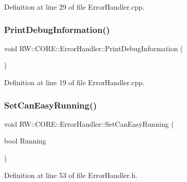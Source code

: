 Definition at line 29 of file Error\+Handler.\+cpp.

\hypertarget{class_r_w_1_1_c_o_r_e_1_1_error_handler_a7356ddc63cc1accf1e81c7a8ebb62187}{}\label{class_r_w_1_1_c_o_r_e_1_1_error_handler_a7356ddc63cc1accf1e81c7a8ebb62187} 
\subsubsection{\texorpdfstring{Print\+Debug\+Information()}{PrintDebugInformation()}}
{\footnotesize\ttfamily void R\+W\+::\+C\+O\+R\+E\+::\+Error\+Handler\+::\+Print\+Debug\+Information (\begin{DoxyParamCaption}{ }\end{DoxyParamCaption})\hspace{0.3cm}{\ttfamily [private]}}



Definition at line 19 of file Error\+Handler.\+cpp.

\hypertarget{class_r_w_1_1_c_o_r_e_1_1_error_handler_ae068accee78e011ae187df1e05b7c9e6}{}\label{class_r_w_1_1_c_o_r_e_1_1_error_handler_ae068accee78e011ae187df1e05b7c9e6} 
\subsubsection{\texorpdfstring{Set\+Can\+Easy\+Running()}{SetCanEasyRunning()}}
{\footnotesize\ttfamily void R\+W\+::\+C\+O\+R\+E\+::\+Error\+Handler\+::\+Set\+Can\+Easy\+Running (\begin{DoxyParamCaption}\item[{bool}]{Running }\end{DoxyParamCaption})\hspace{0.3cm}{\ttfamily [inline]}}



Definition at line 53 of file Error\+Handler.\+h.

\hypertarget{class_r_w_1_1_c_o_r_e_1_1_error_handler_a838abbf533ba65c7f51266507e9d256a}{}\label{class_r_w_1_1_c_o_r_e_1_1_error_handler_a838abbf533ba65c7f51266507e9d256a} 
